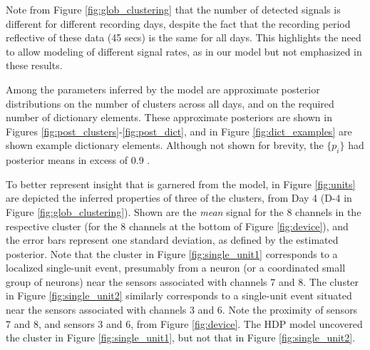 \documentclass[journal]{IEEEtran}
\begin{document}
Note from Figure \ref{fig:glob_clustering} that the number of
detected signals is different for different recording days, despite
the fact that the recording period reflective of these data (45
secs) is the same for all days. This highlights the need to allow
modeling of different signal rates, as in our model but not
emphasized in these results.

Among the parameters inferred by the model are approximate posterior
distributions on the number of clusters across all days, and on the
required number of dictionary elements. These approximate posteriors
are shown in Figures \ref{fig:post_clusters}-\ref{fig:post_dict},
and in Figure \ref{fig:dict_examples} are shown example dictionary
elements. Although not shown for brevity, the $\{p_i\}$ had posterior means in excess of 0.9 .



To better represent insight that is garnered from the model, in Figure \ref{fig:units} are depicted the inferred properties of three of the clusters, from Day 4 (D-4 in Figure \ref{fig:glob_clustering}). Shown are the \emph{mean} signal for the 8 channels in the respective cluster (for the 8 channels at the bottom of Figure \ref{fig:device}), and the error bars represent one standard deviation, as defined by the estimated posterior. Note that the cluster in Figure \ref{fig:single_unit1} corresponds to a localized single-unit event, presumably from a neuron (or a coordinated small group of neurons) near the sensors associated with channels 7 and 8. The cluster in Figure \ref{fig:single_unit2} similarly corresponds to a single-unit event situated near the sensors associated with channels 3 and 6. Note the proximity of sensors 7 and 8, and sensors 3 and 6, from Figure \ref{fig:device}. The HDP model uncovered the cluster in Figure \ref{fig:single_unit1}, but not that in Figure \ref{fig:single_unit2}.
\end{document}
